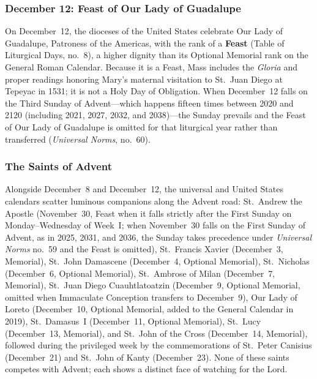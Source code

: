 \subsubsection{December 12: Feast of Our Lady of Guadalupe}

On December~12, the dioceses of the United States celebrate Our Lady of Guadalupe, Patroness of the Americas, with the rank of a \textbf{Feast} (Table of Liturgical Days, no.~8), a higher dignity than its Optional Memorial rank on the General Roman Calendar. Because it is a Feast, Mass includes the \textit{Gloria} and proper readings honoring Mary's maternal visitation to St.~Juan Diego at Tepeyac in 1531; it is not a Holy Day of Obligation. When December~12 falls on the Third Sunday of Advent---which happens fifteen times between 2020 and 2120 (including 2021, 2027, 2032, and 2038)---the Sunday prevails and the Feast of Our Lady of Guadalupe is omitted for that liturgical year rather than transferred (\textit{Universal Norms}, no.~60).

\subsubsection{The Saints of Advent}

Alongside December~8 and December~12, the universal and United States calendars scatter luminous companions along the Advent road: St.~Andrew the Apostle (November~30, Feast when it falls strictly after the First Sunday on Monday--Wednesday of Week~I; when November~30 falls on the First Sunday of Advent, as in 2025, 2031, and 2036, the Sunday takes precedence under \textit{Universal Norms} no.~59 and the Feast is omitted), St.~Francis Xavier (December~3, Memorial), St.~John Damascene (December~4, Optional Memorial), St.~Nicholas (December~6, Optional Memorial), St.~Ambrose of Milan (December~7, Memorial), St.~Juan Diego Cuauhtlatoatzin (December~9, Optional Memorial, omitted when Immaculate Conception transfers to December~9), Our Lady of Loreto (December~10, Optional Memorial, added to the General Calendar in 2019), St.~Damasus~I (December~11, Optional Memorial), St.~Lucy (December~13, Memorial), and St.~John of the Cross (December~14, Memorial), followed during the privileged week by the commemorations of St.~Peter Canisius (December~21) and St.~John of Kanty (December~23). None of these saints competes with Advent; each shows a distinct face of watching for the Lord.
